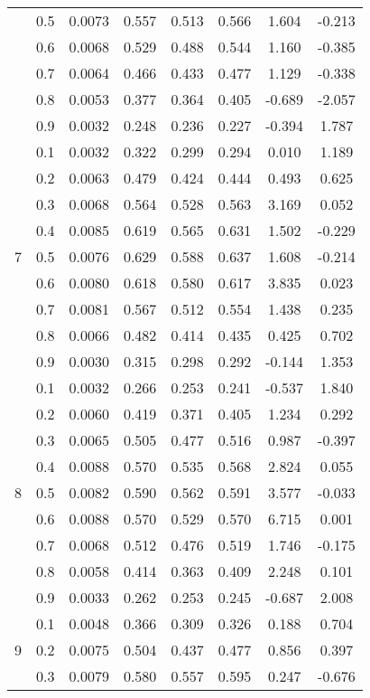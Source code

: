 \documentclass[11pt,a4paper]{report}
\begin{document}
\begin{longtable}{ | c | c || c | c | c | c | c | c | }
 & 0.5 & 0.0073 & 0.557 & 0.513 & 0.566 & 1.604 & -0.213 \\
 & 0.6 & 0.0068 & 0.529 & 0.488 & 0.544 & 1.160 & -0.385 \\
 & 0.7 & 0.0064 & 0.466 & 0.433 & 0.477 & 1.129 & -0.338 \\
 & 0.8 & 0.0053 & 0.377 & 0.364 & 0.405 & -0.689 & -2.057 \\
 & 0.9 & 0.0032 & 0.248 & 0.236 & 0.227 & -0.394 & 1.787 \\
 \hline
\multirow{9}{*}{7} & 0.1 & 0.0032 & 0.322 & 0.299 & 0.294 & 0.010 & 1.189 \\
 & 0.2 & 0.0063 & 0.479 & 0.424 & 0.444 & 0.493 & 0.625 \\
 & 0.3 & 0.0068 & 0.564 & 0.528 & 0.563 & 3.169 & 0.052 \\
 & 0.4 & 0.0085 & 0.619 & 0.565 & 0.631 & 1.502 & -0.229 \\
 & 0.5 & 0.0076 & 0.629 & 0.588 & 0.637 & 1.608 & -0.214 \\
 & 0.6 & 0.0080 & 0.618 & 0.580 & 0.617 & 3.835 & 0.023 \\
 & 0.7 & 0.0081 & 0.567 & 0.512 & 0.554 & 1.438 & 0.235 \\
 & 0.8 & 0.0066 & 0.482 & 0.414 & 0.435 & 0.425 & 0.702 \\
 & 0.9 & 0.0030 & 0.315 & 0.298 & 0.292 & -0.144 & 1.353 \\
 \hline
\multirow{9}{*}{8} & 0.1 & 0.0032 & 0.266 & 0.253 & 0.241 & -0.537 & 1.840 \\
 & 0.2 & 0.0060 & 0.419 & 0.371 & 0.405 & 1.234 & 0.292 \\
 & 0.3 & 0.0065 & 0.505 & 0.477 & 0.516 & 0.987 & -0.397 \\
 & 0.4 & 0.0088 & 0.570 & 0.535 & 0.568 & 2.824 & 0.055 \\
 & 0.5 & 0.0082 & 0.590 & 0.562 & 0.591 & 3.577 & -0.033 \\
 & 0.6 & 0.0088 & 0.570 & 0.529 & 0.570 & 6.715 & 0.001 \\
 & 0.7 & 0.0068 & 0.512 & 0.476 & 0.519 & 1.746 & -0.175 \\
 & 0.8 & 0.0058 & 0.414 & 0.363 & 0.409 & 2.248 & 0.101 \\
 & 0.9 & 0.0033 & 0.262 & 0.253 & 0.245 & -0.687 & 2.008 \\
 \hline
\multirow{9}{*}{9} & 0.1 & 0.0048 & 0.366 & 0.309 & 0.326 & 0.188 & 0.704 \\
 & 0.2 & 0.0075 & 0.504 & 0.437 & 0.477 & 0.856 & 0.397 \\
 & 0.3 & 0.0079 & 0.580 & 0.557 & 0.595 & 0.247 & -0.676 \\

\end{longtable}
\end{document}

